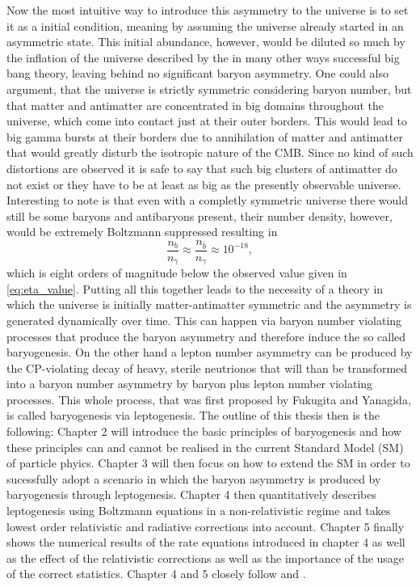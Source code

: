 Now the most intuitive way to introduce this asymmetry to the universe is to set it as a initial condition, meaning by assuming the universe already started in an asymmetric state. This initial abundance, however, would be diluted so much by the inflation of the universe described by the in many other ways successful big bang theory, leaving behind no significant baryon asymmetry. One could also argument, that the universe is strictly symmetric considering baryon number, but that matter and antimatter are concentrated in big domains throughout the universe, which come into contact just at their outer borders. This would lead to big gamma bursts at their borders due to annihilation of matter and antimatter that would greatly disturb the isotropic nature of the CMB. Since no kind of such distortions are observed it is safe to say that such big clusters of antimatter do not exist or they have to be at least as big as the presently observable universe\cite{Cline:2006ts}. Interesting to note is that even with a completly symmetric universe there would still be some baryons and antibaryons present, their number density, however, would be extremely Boltzmann suppressed resulting in
\begin{equation}
	\frac{n_b}{n_\gamma}\approx	\frac{n_{\bar{b}}}{n_\gamma}\approx10^{-18},
\end{equation}
which is eight orders of magnitude below the observed value given in \eqref{eq:eta_value}.\newline \indent
Putting all this together leads to the necessity of a theory in which the universe is initially matter-antimatter symmetric and the asymmetry is generated dynamically over time. This can happen via baryon number violating processes that produce the baryon asymmetry and therefore induce the so called baryogenesis. On the other hand a lepton number asymmetry can be produced by the CP-violating decay of heavy, sterile neutrionos that will than be transformed into a baryon number asymmetry by baryon plus lepton number violating processes. This whole process, that was first proposed by Fukugita and Yanagida\cite{Fukugita:1986hr}, is called baryogenesis via leptogenesis. \newline \indent
The outline of this thesis then is the following: Chapter 2 will introduce the basic principles of baryogenesis and how these principles can and cannot be realised in the current Standard Model (SM) of particle phyics. Chapter 3 will then focus on how to extend the SM in order to sucessfully adopt a scenario in which the baryon asymmetry is produced by baryogenesis through leptogenesis. Chapter 4 then quantitatively describes leptogenesis using Boltzmann equations in a non-relativistic regime and takes lowest order relativistic and radiative corrections into account. Chapter 5 finally shows the numerical results of the rate equations introduced in chapter 4 as well as the effect of the relativistic%
corrections as well as the importance of the usage of the correct statistics. \newline\indent
Chapter 4 and 5 closely follow \cite{Bodeker:2013qaa} and \cite{Wormann:2016yyi}.